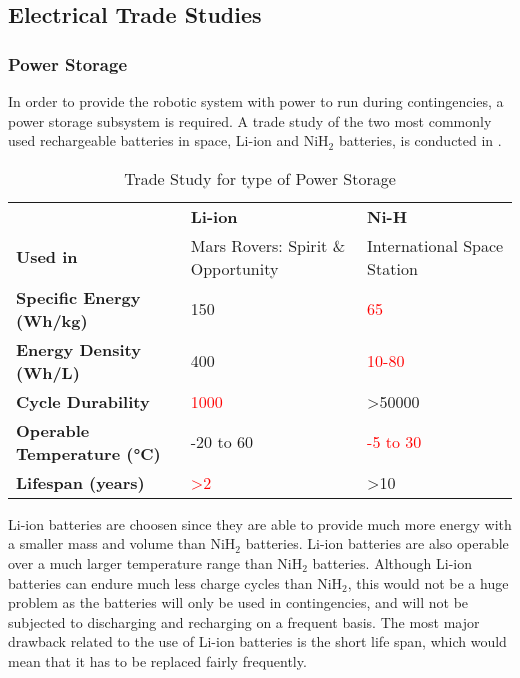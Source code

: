 \subsection{Electrical Trade Studies}
\label{subsec:Electrical Trade Studies}
\subsubsection{Power Storage}
\label{sect:powerto}
In order to provide the robotic system with power to run during contingencies, a power storage subsystem is required. A trade study of the two most commonly used rechargeable batteries in space, Li-ion and NiH$_2$ batteries,
 is conducted in .
\begin{table}[H]
\centering
\caption{Trade Study for type of Power Storage}
\begin{tabular}{|P{6cm}|P{4.2cm}|P{4.2cm}|}
\hline
	&	\textbf{Li-ion}	&	\textbf{Ni-H}	\\\hhline{|=|=|=|}
\textbf{Used in}	&
Mars Rovers: Spirit \& Opportunity \cite{Liion_Mars}	&
International Space Station \cite{ISS_power}	\\\hline
\textbf{Specific Energy (Wh/kg)}	&
\textcolor{OliveGreen}{150 \cite{batt_primer}}	&	
\textcolor{red}{65 \cite{NiH_se}}	\\\hline
\textbf{Energy Density (Wh/L)}	&
\textcolor{OliveGreen}{400 \cite{batt_primer}}	&	
\textcolor{red}{10-80 \cite{NASA_energy}}	\\\hline
\textbf{Cycle Durability}	&
\textcolor{red}{1000 \cite{batt_primer}}	&	
\textcolor{OliveGreen}{\textgreater50000 \cite{NASA_energy}}	\\\hline
\textbf{Operable Temperature (\si{\degreeCelsius})}	&
\textcolor{OliveGreen}{-20 to 60 \cite{batt_primer}}	&	
\textcolor{red}{-5 to 30 \cite{NASA_energy}}	\\\hline
\textbf{Lifespan (years)}	&
\textcolor{red}{\textgreater2 \cite{NASA_energy}}	&	
\textcolor{OliveGreen}{\textgreater10 \cite{NASA_energy}}	\\\hline
\end{tabular}
\label{table:powerto}
\end{table}
Li-ion batteries are choosen since they are able to provide much more energy with a smaller mass and volume than NiH$_2$ batteries. Li-ion batteries are also operable over a much larger temperature range than NiH$_2$ batteries. Although Li-ion batteries can endure much less charge cycles than NiH$_2$, this would not be a huge problem as the batteries will only be used in contingencies, and will not be subjected to discharging and recharging on a frequent basis. The most major drawback related to the use of Li-ion batteries is the short life span, which would mean that it has to be replaced fairly frequently.

